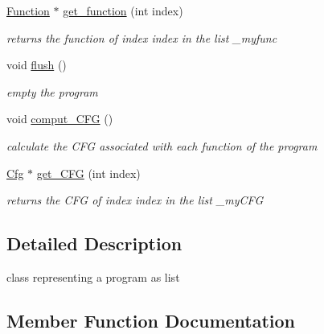 \begin{DoxyCompactItemize}
\mbox{\label{class_program_aea6d5c7367bbee48ec5cbb295ef6fd5f}} 
\mbox{\hyperlink{class_function}{Function}} $\ast$ \mbox{\hyperlink{class_program_aea6d5c7367bbee48ec5cbb295ef6fd5f}{get\+\_\+function}} (int index)
\begin{DoxyCompactList}\small\item\em returns the function of index index in the list \+\_\+myfunc \end{DoxyCompactList}\item 
\mbox{\label{class_program_a1cef65227311c68a2e81c89dcbc16914}} 
void \mbox{\hyperlink{class_program_a1cef65227311c68a2e81c89dcbc16914}{flush}} ()
\begin{DoxyCompactList}\small\item\em empty the program \end{DoxyCompactList}\item 
\mbox{\label{class_program_a0d1d9386925418b5fd0a09bf5de16208}} 
void \mbox{\hyperlink{class_program_a0d1d9386925418b5fd0a09bf5de16208}{comput\+\_\+\+C\+FG}} ()
\begin{DoxyCompactList}\small\item\em calculate the C\+FG associated with each function of the program \end{DoxyCompactList}\item 
\mbox{\label{class_program_a69ddee195c76bff05733d927e315f319}} 
\mbox{\hyperlink{class_cfg}{Cfg}} $\ast$ \mbox{\hyperlink{class_program_a69ddee195c76bff05733d927e315f319}{get\+\_\+\+C\+FG}} (int index)
\begin{DoxyCompactList}\small\item\em returns the C\+FG of index index in the list \+\_\+my\+C\+FG \end{DoxyCompactList}\end{DoxyCompactItemize}


\subsection{Detailed Description}
class representing a program as list 

\subsection{Member Function Documentation}
\mbox{\label{class_program_a3db3e17c96bb809c3e6f81b8bc22ee20}} 
